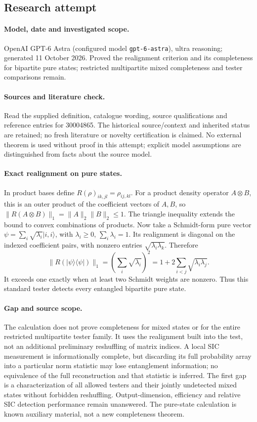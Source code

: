 \documentclass[11pt]{article}
\begin{document}
\subsection{Research attempt}
\paragraph{Model, date and investigated scope.}
OpenAI GPT-6 Astra (configured model \texttt{gpt-6-astra}), ultra reasoning; generated 11 October 2026. Proved the realignment criterion and its completeness for bipartite pure states; restricted multipartite mixed completeness and tester comparisons remain.

\paragraph{Sources and literature check.}
Read the supplied definition, catalogue wording, source qualifications and reference entries for 30004865. The historical source/context and inherited status are retained; no fresh literature or novelty certification is claimed. No external theorem is used without proof in this attempt; explicit model assumptions are distinguished from facts about the source model.

\paragraph{Exact realignment on pure states.} In product bases define \(R(\rho)_{ik,jl}=\rho_{ij,kl}\). For a product density operator \(A\otimes B\), this is an outer product of the coefficient vectors of \(A,B\), so \(\|R(A\otimes B)\|_1=\|A\|_2\|B\|_2\le1\). The triangle inequality extends the bound to convex combinations of products. Now take a Schmidt-form pure vector \(\psi=\sum_i\sqrt{\lambda_i}|i,i\rangle\), with \(\lambda_i\ge0\), \(\sum_i\lambda_i=1\). Its realignment is diagonal on the indexed coefficient pairs, with nonzero entries \(\sqrt{\lambda_i\lambda_k}\). Therefore
\[
 \|R(|\psi\rangle\langle\psi|)\|_1
 =\left(\sum_i\sqrt{\lambda_i}\right)^2
 =1+2\sum_{i<j}\sqrt{\lambda_i\lambda_j}.
\]
It exceeds one exactly when at least two Schmidt weights are nonzero. Thus this standard tester detects every entangled bipartite pure state.
\paragraph{Gap and source scope.} The calculation does not prove completeness for mixed states or for the entire restricted multipartite tester family. It uses the realignment built into the test, not an additional preliminary reshuffling of matrix indices. A local SIC measurement is informationally complete, but discarding its full probability array into a particular norm statistic may lose entanglement information; no equivalence of the full reconstruction and that statistic is inferred. The first gap is a characterization of all allowed testers and their jointly undetected mixed states without forbidden reshuffling. Output-dimension, efficiency and relative SIC detection performance remain unanswered. The pure-state calculation is known auxiliary material, not a new completeness theorem.
\end{document}
